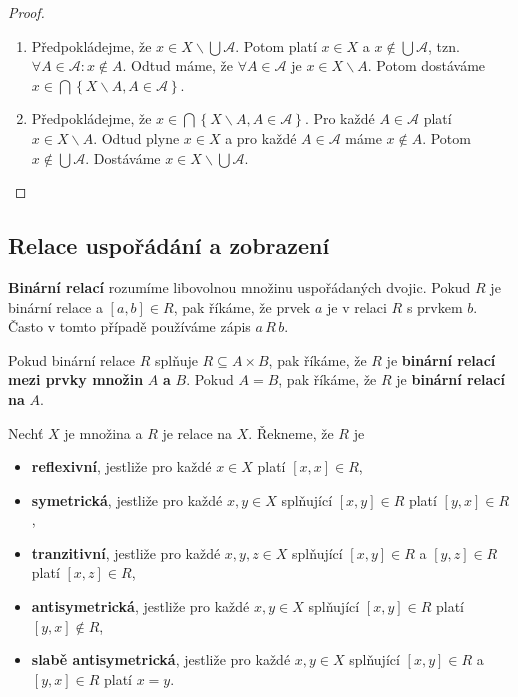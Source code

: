 \begin{proof}
	\,
	\begin{enumerate}
		\item[$\subseteq$] Předpokládejme, že $x\in X\smallsetminus \bigcup \mathcal A.$ Potom platí
		$x\in X$ a $x\notin \bigcup \mathcal A$, tzn. $\forall A\in \mathcal A:x \notin A$. Odtud máme, že
		$\forall A\in \mathcal A$ je $x\in X\smallsetminus A$. Potom dostáváme $x\in \bigcap \left \{ X\smallsetminus A, A\in \mathcal A \right \} $.
		\item[$\supseteq$] Předpokládejme, že $x\in \bigcap \left \{ X\smallsetminus A, A \in \mathcal A \right \} $. Pro každé
		$A\in \mathcal A$ platí $x\in X\smallsetminus A$. Odtud plyne $x\in X$ a pro každé $A\in \mathcal A$ máme $x\notin A$.
		Potom $x\notin \bigcup \mathcal A$. Dostáváme $x\in X\smallsetminus \bigcup\mathcal A$.\qedhere
	\end{enumerate}
\end{proof}

\subsection{Relace uspořádání a zobrazení}

\begin{definice}
\textbf{Binární relací} rozumíme libovolnou množinu uspořádaných dvojic. Pokud $R$ je
binární relace a $[a,b]\in R$, pak říkáme, že prvek $a$ je v relaci $R$ s prvkem $b$.
Často v tomto případě používáme zápis $a\,R\,b$.
\par Pokud binární relace $R$ splňuje $R\subseteq A\times B$, pak říkáme, že $R$ je \textbf{binární relací
mezi prvky množin} $A$ \textbf{a} $B$. Pokud $A=B$, pak říkáme, že $R$ je \textbf{binární relací na} $A$.
\end{definice}

\begin{definice}
Nechť $X$ je množina a $R$ je relace na $X$. Řekneme, že $R$ je
\begin{itemize}
\item \textbf{reflexivní}, jestliže pro každé $x\in X$ platí $[x,x]\in R$,
\item \textbf{symetrická}, jestliže pro každé $x,y\in X$ splňující $[x,y]\in R$ platí $[y,x]\in R$,
\item \textbf{tranzitivní}, jestliže pro každé $x,y,z\in X$ splňující $[x,y]\in R$ a $[y,z]\in R$
platí $[x,z]\in R$,
\item \textbf{antisymetrická}, jestliže pro každé $x,y\in X$ splňující $[x,y]\in R$ platí
$[y,x]\notin R$,
\item \textbf{slabě antisymetrická}, jestliže pro každé $x,y\in X$ splňující
$[x,y]\in R$ a $[y,x]\in R$ platí $x=y$.
\end{itemize}
\end{definice}

